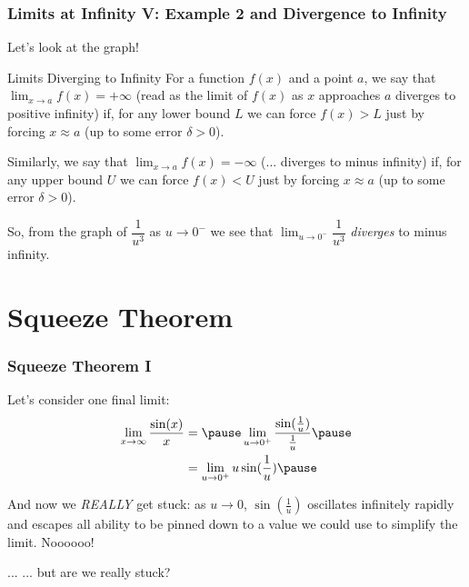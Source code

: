 \documentclass{ltx-talk}
\begin{document}
\begin{frame}
  \frametitle{Limits at Infinity V: Example 2 and Divergence to Infinity}
  Let's look at the graph! \pause

  \begin{block}{Limits Diverging to Infinity}
    For a function $f(x)$ and a point $a$, we say that $\lim_{x \rightarrow a} f(x) = +\infty$ (read as the limit of $f(x)$ as $x$ approaches $a$ diverges to positive infinity) \pause
    if, for any lower bound $L$ \pause we can force $f(x) > L$ \pause just by forcing $x \approx a$ (up to some error $\delta > 0$). \pause

    Similarly, we say that $\lim_{x \rightarrow a} f(x) = - \infty$ (... diverges to minus infinity) \pause
    if, for any upper bound $U$ \pause we can force $f(x) < U$ \pause just by forcing $x \approx a$ (up to some error $\delta > 0$). \pause
  \end{block}

  So, from the graph of $\dfrac{1}{u^3}$ as $u \rightarrow 0^{-}$ we see that \pause
  $\lim_{u \rightarrow 0^{-}} \dfrac{1}{u^3}$ \textit{diverges} \pause to minus infinity.
\end{frame}

\section{Squeeze Theorem}

\begin{frame}
  \frametitle{Squeeze Theorem I}

  Let's consider one final limit: \pause
  \begin{align}
    \lim_{x \rightarrow \infty} \dfrac{\sin(x)}{x} &= \pause \lim_{u \rightarrow 0^{+}} \dfrac{\sin(\frac{1}{u})}{\frac{1}{u}} \pause \\
                                                   &= \lim_{u \rightarrow 0^{+}} u \sin(\frac{1}{u}) \pause
  \end{align}

  And now we \textit{REALLY} get stuck: \pause as $u \rightarrow 0$, $\sin(\frac{1}{u})$
  oscillates infinitely rapidly and escapes all ability to be pinned down to a value we could use to simplify the limit. \pause
  Noooooo! \pause
  
  ... \pause ... \pause but are we really stuck?
\end{frame}
\end{document}
